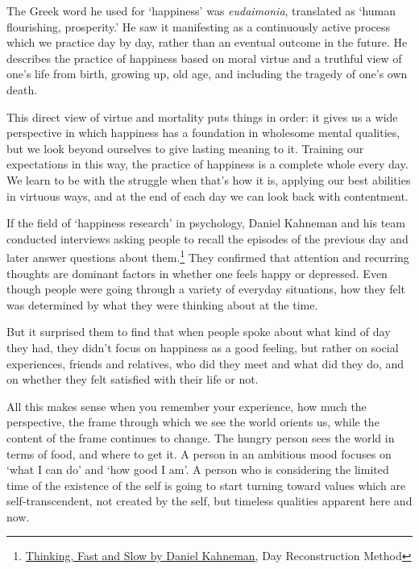 The Greek word he used for `happiness' was \emph{eudaimonia}, translated
as `human flourishing, prosperity.' He saw it manifesting as a
continuously active process which we practice day by day, rather than an
eventual outcome in the future. He describes the practice of happiness
based on moral virtue and a truthful view of one's life from birth,
growing up, old age, and including the tragedy of one's own death.

This direct view of virtue and mortality puts things in order: it gives
us a wide perspective in which happiness has a foundation in wholesome
mental qualities, but we look beyond ourselves to give lasting meaning
to it. Training our expectations in this way, the practice of happiness
is a complete whole every day. We learn to be with the struggle when
that's how it is, applying our best abilities in virtuous ways, and at
the end of each day we can look back with contentment.

If the field of `happiness research' in psychology, Daniel Kahneman and
his team conducted interviews asking people to recall the episodes of
the previous day and later answer questions about them.\footnote{\href{https://www.goodreads.com/book/show/11468377-thinking-fast-and-slow}{Thinking,
  Fast and Slow by Daniel Kahneman}, Day Reconstruction Method} They
confirmed that attention and recurring thoughts are dominant factors in
whether one feels happy or depressed. Even though people were going
through a variety of everyday situations, how they felt was determined
by what they were thinking about at the time.


But it surprised them to find that when people spoke about what kind of
day they had, they didn't focus on happiness as a good feeling, but
rather on social experiences, friends and relatives, who did they meet
and what did they do, and on whether they felt satisfied with their life
or not.

All this makes sense when you remember your experience, how much the
perspective, the frame through which we see the world orients us, while
the content of the frame continues to change. The hungry person sees the
world in terms of food, and where to get it. A person in an ambitious
mood focuses on `what I can do' and `how good I am'. A person who is
considering the limited time of the existence of the self is going to
start turning toward values which are self-transcendent, not created by
the self, but timeless qualities apparent here and now.

